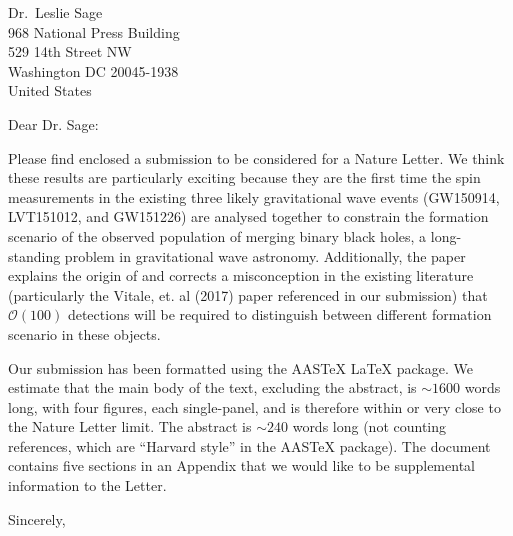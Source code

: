\documentclass{letter}
\begin{document}
\begin{letter}{Dr.\ Leslie Sage\\968 National Press Building\\529 14th Street NW\\Washington DC 20045-1938\\United States}

\opening{Dear Dr. Sage:}

Please find enclosed a submission to be considered for a Nature
Letter.  We think these results are particularly exciting because they
are the first time the spin measurements in the existing three likely
gravitational wave events (GW150914, LVT151012, and GW151226) are
analysed together to constrain the formation scenario of the observed
population of merging binary black holes, a long-standing problem in
gravitational wave astronomy.  Additionally, the paper explains the
origin of and corrects a misconception in the existing literature
(particularly the Vitale, et. al (2017) paper referenced in our
submission) that $\mathcal{O}(100)$ detections will be required to
distinguish between different formation scenario in these objects.

Our submission has been formatted using the AASTeX LaTeX package.  We
estimate that the main body of the text, excluding the abstract, is
$\sim 1600$ words long, with four figures, each single-panel, and is
therefore within or very close to the Nature Letter limit.  The
abstract is $\sim 240$ words long (not counting references, which are
``Harvard style'' in the AASTeX package).  The document contains five
sections in an Appendix that we would like to be supplemental
information to the Letter.

\closing{Sincerely,}

\end{letter}
\end{document}
